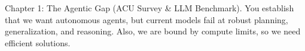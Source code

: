 Chapter 1: The Agentic Gap (ACU Survey \& LLM Benchmark). You establish that we want autonomous agents, but current models fail at robust planning, generalization, and reasoning. Also, we are bound by compute limits, so we need efficient solutions.
